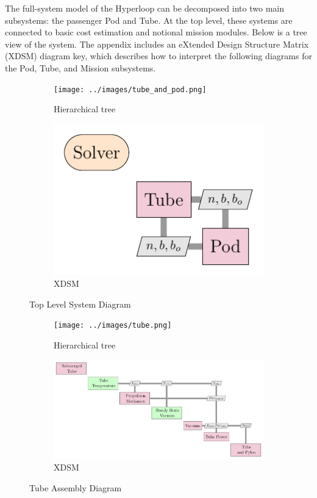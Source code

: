 The full-system model of the Hyperloop can be decomposed into two main
subsystems: the passenger Pod and Tube. At the top level, these systems are
connected to basic cost estimation and notional
mission modules. Below is a tree view of the system.
The appendix includes an eXtended Design Structure Matrix (XDSM) diagram key,
which describes how to interpret the following diagrams for the Pod, Tube, and Mission subsystems.

\begin{figure}
\centering
\begin{subfigure}[t]{.4\textwidth}
  \centering
  \texttt{[image: ../images/tube\_and\_pod.png]}
  \caption{Hierarchical tree}
  \label{fig:tree:tube_and_pod}
\end{subfigure}%
\begin{subfigure}[t]{.6\textwidth}
  \centering
  \includegraphics[width=1.0\textwidth]{../images/xdsm/tube_and_pod.pdf}
  \caption{XDSM}
  \label{fig:xdsm:toplevel}
\end{subfigure}
\caption{Top Level System Diagram}
\label{fig:top}
\end{figure}

\begin{figure}
\centering
\begin{subfigure}[t]{.5\textwidth}
  \centering
  \texttt{[image: ../images/tube.png]}
  \caption{Hierarchical tree}
  \label{fig:tree:tube}
\end{subfigure}%
\begin{subfigure}[t]{.5\textwidth}
  \centering
  \includegraphics{../images/xdsm/tube.pdf}
  \caption{XDSM}
  \label{fig:xdsm:tube}
\end{subfigure}
\caption{Tube Assembly Diagram}
\label{fig:tube}
\end{figure}

